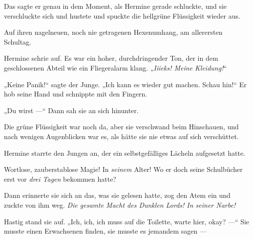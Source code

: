 Das sagte er genau in dem Moment, als Hermine gerade schluckte, und sie verschluckte sich und hustete und spuckte die hellgrüne Flüssigkeit wieder aus.

Auf ihren nagelneuen, noch nie getragenen Hexenumhang, am allerersten Schultag.

Hermine schrie auf. Es war ein hoher, durchdringender Ton, der in dem geschlossenen Abteil wie ein Fliegeralarm klang.
„\emph{Iiieks! Meine Kleidung!}“

„Keine Panik!“ sagte der Junge.
„Ich kann es wieder gut machen. Schau hin!“ Er hob seine Hand und schnippte mit den Fingern.

„Du wirst —“ Dann sah sie an sich hinunter.

Die grüne Flüssigkeit war noch da, aber sie verschwand beim Hinschauen, und nach wenigen Augenblicken war es, als hätte sie nie etwas auf sich verschüttet.

Hermine starrte den Jungen an, der ein selbstgefälliges Lächeln aufgesetzt hatte.

Wortlose, zauberstablose Magie! In \emph{seinem} Alter! Wo er doch seine Schulbücher erst vor \emph{drei Tagen} bekommen hatte?

Dann erinnerte sie sich an das, was sie gelesen hatte, zog den Atem ein und zuckte von ihm weg. \emph{Die gesamte Macht des Dunklen Lords! In seiner Narbe!}

Hastig stand sie auf.
„Ich, ich, ich muss auf die Toilette, warte hier, okay? —“ Sie musste einen Erwachsenen finden, sie musste es jemandem sagen —

